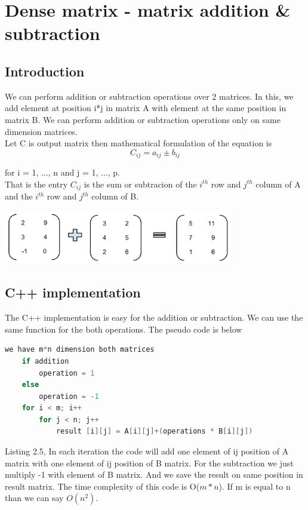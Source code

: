 \section{Dense matrix - matrix addition \& subtraction}
\subsection{Introduction}
We can perform addition or subtraction operations over 2 matrices. In this, we add element at position i*j in matrix A with element at the same position in matrix B. We can perform addition or subtraction operations only on same dimension matrices.\\
Let C is output matrix then mathematical formulation of the equation is
\begin{equation}
	C_{ij}=a_{ij} \pm b_{ij}
\end{equation}

for i = 1, ..., n and j = 1, ..., p.\\
That is the entry $C_{ij}$ is the sum or subtracion of the $i^{th}$ row and $j^{th}$ column of A and the $i^{th}$ row and $j^{th}$ column of B.\\
\begin{center}
	\includegraphics[width = 10cm]{Chapters/matrix-matrix-addition.png}
\end{center}

\subsection{C++ implementation}
The C++ implementation is easy for the addition or subtraction. We can use the same function for the both operations. The pseudo code is below
\begin{lstlisting}[language=C, caption=matrix addition or subtraction in C++]
	we have m*n dimension both matrices
	if addition 
		operation = 1
	else 
		operation = -1
	for i < m; i++
		for j < n; j++
			result [i][j] = A[i][j]+(operations * B[i][j])
\end{lstlisting}
Listing 2.5, In each iteration the code will add one element of ij position of A matrix with one element of ij position of B matrix. For the subtraction we just multiply -1 with element of B matrix. And we save the result on same position in result matrix. The time complexity of this code is O($m*n$). If m is equal to n than we can say $O(n^2)$. 
